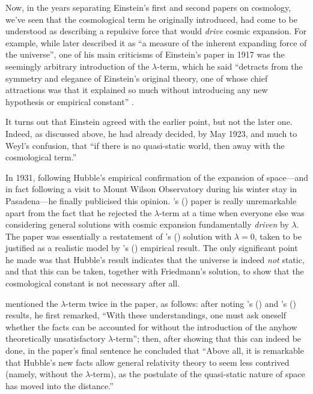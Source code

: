 \documentclass[12 pt]{article}
\def\citeapos#1{\citeauthor{#1}'s (\citeyear{#1})}
\begin{document}
Now, in the years separating Einstein's first \citep{Einstein1917} and second \citep{Einstein1931a} papers on cosmology, we've seen that the cosmological term he originally introduced, had come to be understood as describing a repulsive force that would \textit{drive} cosmic expansion. For example, while \citet{deSitter1930} later described it as ``a measure of the inherent expanding force of the universe'', one of his main criticisms of Einstein's paper in 1917 was the seemingly arbitrary introduction of the $\lambda$-term, which he said ``detracts from the symmetry and elegance of Einstein's original theory, one of whose chief attractions was that it explained so much without introducing any new hypothesis or empirical constant'' \citep{deSitter1917a}.

It turns out that Einstein agreed with the earlier point, but not the later one. Indeed, as discussed above, he had already decided, by May 1923, and much to Weyl's confusion, that ``if there is no quasi-static world, then away with the cosmological term.''	

In 1931, following Hubble's empirical confirmation of the expansion of space---and in fact following a visit to Mount Wilson Observatory during his winter stay in Pasadena---he finally publicised this opinion. \citeapos{Einstein1931a} paper is really unremarkable apart from the fact that he rejected the $\lambda$-term at a time when everyone else was considering general solutions with cosmic expansion fundamentally \textit{driven} by $\lambda$. The paper was essentially a restatement of \citeapos{Friedmann1922} solution with $\lambda=0$, taken to be justified as a realistic model by \citeapos{Hubble1929} empirical result. The only significant point he made was that Hubble's result indicates that the universe is indeed \textit{not} static, and that this can be taken, together with Friedmann's solution, to show that the cosmological constant is not necessary after all. 

\citet{Einstein1931a} mentioned the $\lambda$-term twice in the paper, as follows: after noting \citeapos{Friedmann1922} and \citeapos{Hubble1929} results, he first remarked, ``With these understandings, one must ask oneself whether the facts can be accounted for without the introduction of the anyhow theoretically unsatisfactory $\lambda$-term''; then, after showing that this can indeed be done, in the paper's final sentence he concluded that ``Above all, it is remarkable that Hubble's new facts allow general relativity theory to seem less contrived (namely, without the $\lambda$-term), as the postulate of the quasi-static nature of space has moved into the distance.''
\end{document}
